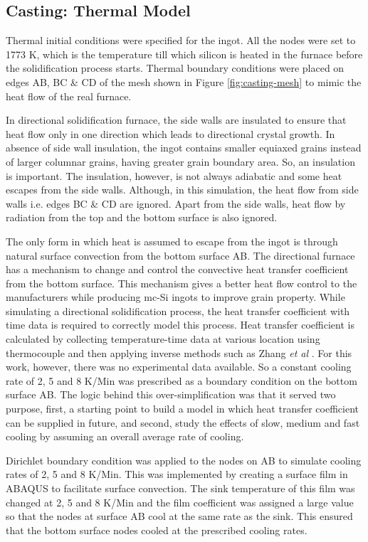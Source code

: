 \subsection{Casting: Thermal Model}
Thermal initial conditions were specified for the ingot. All the nodes were set to 1773 K, which is the temperature till which silicon is heated in the furnace before the solidification process starts. Thermal boundary conditions were placed on edges AB, BC \& CD of the mesh shown in Figure \ref{fig:casting-mesh} to mimic the heat flow of the real furnace.

In directional solidification furnace, the side walls are insulated to ensure that heat flow only in one direction which leads to directional crystal growth. In absence of side wall insulation, the ingot contains smaller equiaxed grains instead of larger columnar grains, having greater grain boundary area. So, an insulation is important. The insulation, however, is not always adiabatic and some heat escapes from the side walls. Although, in this simulation, the heat flow from side walls i.e. edges BC \& CD are ignored. Apart from the side walls, heat flow by radiation from the top and the bottom surface is also ignored.

The only form in which heat is assumed to escape from the ingot is through natural surface convection from the bottom surface AB. The directional furnace has a mechanism to change and control the convective heat transfer coefficient from the bottom surface. This mechanism gives a better heat flow control to the manufacturers while producing mc-Si ingots to improve grain property. While simulating a directional solidification process, the heat transfer coefficient with time data is required to correctly model this process. Heat transfer coefficient is calculated by collecting temperature-time data at various location using thermocouple and then applying inverse methods such as Zhang \textit{et al} \cite{zhang2014development}. For this work, however, there was no experimental data available. So a constant cooling rate of 2, 5 and 8 K/Min was prescribed as a boundary condition on the bottom surface AB. The logic behind this over-simplification was that it served two purpose, first, a starting point to build a model in which heat transfer coefficient can be supplied in future, and second, study the effects of slow, medium and fast cooling by assuming an overall average rate of cooling.

Dirichlet boundary condition was applied to the nodes on AB to simulate cooling rates of 2, 5 and 8 K/Min. This was implemented by creating a surface film in ABAQUS to facilitate surface convection. The sink temperature of this film was changed at 2, 5 and 8 K/Min and the film coefficient was assigned a large value so that the nodes at surface AB cool at the same rate as the sink. This ensured that the bottom surface nodes cooled at the prescribed cooling rates.

